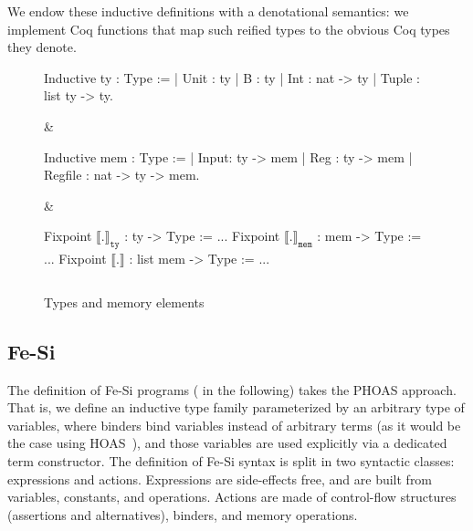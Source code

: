 \documentclass{llncs}
\newcommand{\denote}[1]{\llbracket #1 \rrbracket}
\newcommand{\denotety}[1]{\denote{\mathtt{#1}}_{\mathtt{ty}}}
\newcommand{\denotemem}[1]{\denote{\mathtt{#1}}_{\mathtt{mem}}}
\begin{document}
We endow these inductive definitions with a denotational semantics: we
implement Coq functions that map such reified types to the obvious Coq
types they denote.

\begin{figure}
  \centering
\begin{threelistings}
\begin{coq}
Inductive ty : Type :=
| Unit : ty 
| B : ty 
| Int : nat -> ty
| Tuple : list ty -> ty.     
\end{coq}&
\begin{coq}
Inductive mem : Type :=
| Input: ty ->  mem
| Reg : ty -> mem
| Regfile : nat -> ty -> mem. 
$ $
\end{coq}
&
\begin{coq}
Fixpoint $\denotety{.}$ : ty -> Type := ...
Fixpoint $\denotemem{.}$ : mem -> Type := ...
Fixpoint $\denote{.}$ : list mem -> Type := ...

$ $
\end{coq}
\end{threelistings}
\caption{Types and memory elements}
  \label{fig:type}
\end{figure}




\subsection{Fe-Si}
The definition of Fe-Si programs ( in the following)
takes the PHOAS approach. 
%
That is, we define an inductive type family parameterized by an
arbitrary type  of variables, where binders bind variables
instead of arbitrary terms (as it would be the case using
HOAS~\cite{DBLP:conf/pldi/PfenningE88}), and those variables are used
explicitly via a dedicated term constructor.
%
The definition of Fe-Si syntax is split in two syntactic classes:
expressions and actions. 
%
Expressions are side-effects free, and are built from variables,
constants, and operations.
%
Actions are made of control-flow structures (assertions and
alternatives), binders, and memory operations. 
\end{document}

